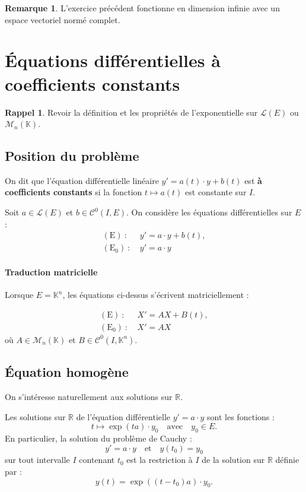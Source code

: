\documentclass[french]{article}
\newcommand{\R}{\mathbb{R}}
\newcommand{\K}{\mathbb{K}}
\theoremstyle{plain}
\theoremstyle{definition}
\newtheorem*{rmq}{Remarque}
\newtheorem*{rappel}{Rappel}
\theoremstyle{remark}
\begin{document}
\begin{rmq}
	L'exercice précédent fonctionne en dimension infinie avec un espace vectoriel normé complet.
\end{rmq}

\section{Équations différentielles à coefficients constants}

\begin{rappel}
	Revoir la définition et les propriétés de l'exponentielle sur $\mathcal{L}(E)$ ou $\mathcal{M}_n(\K)$.
\end{rappel}

\subsection{Position du problème}

\begin{dfn}
	On dit que l'équation différentielle linéaire $y'=a(t)\cdot y+b(t)$ est \textbf{à coefficients constants} si la fonction $t\mapsto a(t)$ est constante sur $I$.
\end{dfn}

Soit $a\in\mathcal{L}(E)$ et $b\in\mathcal{C}^0(I,E)$. On considère les équations différentielles sur $E$ :
\begin{align*}
	(\text{E})\ :\ &y'=a\cdot y+b(t),\\
	(\text{E}_0)\ :\ &y'=a\cdot y
\end{align*}

\paragraph{Traduction matricielle} Lorsque $E=\K^n$, les équations ci-dessus s'écrivent matriciellement :

\begin{align*}
	(\text{E})\ :\ &X'=AX+B(t),\\
	(\text{E}_0)\ :\ &X'=AX
\end{align*} où  $A\in\mathcal{M}_n(\K)$ et $B\in\mathcal{C}^0(I,\K^n)$.

\subsection{Équation homogène}

On s'intéresse naturellement aux solutions sur $\R$.

\begin{prop}%
	Les solutions sur $\R$ de l'équation différentielle $y'=a\cdot y$ sont les fonctions :
	$$t\mapsto\exp(ta)\cdot y_0\quad\text{avec}\quad y_0\in E.$$
	En particulier, la solution du problème de Cauchy :
	$$y'=a\cdot y\quad\text{et}\quad y(t_0)=y_0$$
	sur tout intervalle $I$ contenant $t_0$ est la restriction à $I$ de la solution sur $\R$ définie par :
	$$y(t)=\exp((t-t_0)a)\cdot y_0.$$
\end{prop}
\end{document}
